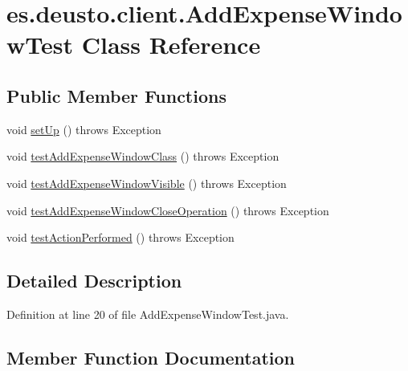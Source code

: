 \hypertarget{classes_1_1deusto_1_1client_1_1_add_expense_window_test}{}\section{es.\+deusto.\+client.\+Add\+Expense\+Window\+Test Class Reference}
\label{classes_1_1deusto_1_1client_1_1_add_expense_window_test}
\subsection*{Public Member Functions}
\begin{DoxyCompactItemize}
\item 
void \hyperlink{classes_1_1deusto_1_1client_1_1_add_expense_window_test_aad34e627ec45525d6a2c3cd84a5b7e53}{set\+Up} ()  throws Exception 
\item 
void \hyperlink{classes_1_1deusto_1_1client_1_1_add_expense_window_test_ab9978ae6c91bff59cd0248dcf64162b0}{test\+Add\+Expense\+Window\+Class} ()  throws Exception 
\item 
void \hyperlink{classes_1_1deusto_1_1client_1_1_add_expense_window_test_abde6a6bf7c49590ba9bcf9e466193ff0}{test\+Add\+Expense\+Window\+Visible} ()  throws Exception 
\item 
void \hyperlink{classes_1_1deusto_1_1client_1_1_add_expense_window_test_abf270b5711e0c1fd74e7818e96487c46}{test\+Add\+Expense\+Window\+Close\+Operation} ()  throws Exception 
\item 
void \hyperlink{classes_1_1deusto_1_1client_1_1_add_expense_window_test_a3a02dbc583b61bd26234be6f840dceee}{test\+Action\+Performed} ()  throws Exception 
\end{DoxyCompactItemize}


\subsection{Detailed Description}


Definition at line 20 of file Add\+Expense\+Window\+Test.\+java.



\subsection{Member Function Documentation}
\mbox{\label{classes_1_1deusto_1_1client_1_1_add_expense_window_test_aad34e627ec45525d6a2c3cd84a5b7e53}} 
